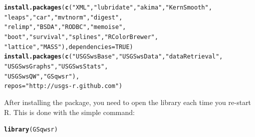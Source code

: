 \documentclass[a4paper,11pt]{article}\usepackage[]{graphicx}\usepackage[]{color}
\makeatletter
\newcommand{\hlnum}[1]{\textcolor[rgb]{0.686,0.059,0.569}{#1}}%
\newcommand{\hlstr}[1]{\textcolor[rgb]{0.192,0.494,0.8}{#1}}%
\newcommand{\hlstd}[1]{\textcolor[rgb]{0.345,0.345,0.345}{#1}}%
\newcommand{\hlkwc}[1]{\textcolor[rgb]{0.333,0.667,0.333}{#1}}%
\newcommand{\hlkwd}[1]{\textcolor[rgb]{0.737,0.353,0.396}{\textbf{#1}}}%
\newenvironment{kframe}{%
 \def\at@end@of@kframe{}%
 \ifinner\ifhmode%
  \def\at@end@of@kframe{\end{minipage}}%
  \begin{minipage}{\columnwidth}%
 \fi\fi%
 \def\FrameCommand##1{\hskip\@totalleftmargin \hskip-\fboxsep
 \colorbox{shadecolor}{##1}\hskip-\fboxsep
     \hskip-\linewidth \hskip-\@totalleftmargin \hskip\columnwidth}%
 \MakeFramed {\advance\hsize-\width
   \@totalleftmargin\z@ \linewidth\hsize
   \@setminipage}}%
 {\par\unskip\endMakeFramed%
 \at@end@of@kframe}
\newenvironment{knitrout}{}{} %
\makeatother
\begin{document}
\begin{knitrout}
\color{fgcolor}\begin{kframe}
\begin{alltt}
\hlkwd{install.packages}\hlstd{(}\hlkwd{c}\hlstd{(}\hlstr{"XML"}\hlstd{,} \hlstr{"lubridate"}\hlstd{,} \hlstr{"akima"}\hlstd{,} \hlstr{"KernSmooth"}\hlstd{,}
                   \hlstr{"leaps"}\hlstd{,} \hlstr{"car"}\hlstd{,} \hlstr{"mvtnorm"}\hlstd{,} \hlstr{"digest"}\hlstd{,}
                   \hlstr{"relimp"}\hlstd{,} \hlstr{"BSDA"}\hlstd{,} \hlstr{"RODBC"}\hlstd{,}\hlstr{"memoise"}\hlstd{,}
                   \hlstr{"boot"}\hlstd{,}\hlstr{"survival"}\hlstd{,}\hlstr{"splines"}\hlstd{,}\hlstr{"RColorBrewer"}\hlstd{,}
                   \hlstr{"lattice"}\hlstd{,}\hlstr{"MASS"}\hlstd{),} \hlkwc{dependencies}\hlstd{=}\hlnum{TRUE}\hlstd{)}
\hlkwd{install.packages}\hlstd{(}\hlkwd{c}\hlstd{(}\hlstr{"USGSwsBase"}\hlstd{,}\hlstr{"USGSwsData"}\hlstd{,}\hlstr{"dataRetrieval"}\hlstd{,}
                   \hlstr{"USGSwsGraphs"}\hlstd{,}\hlstr{"USGSwsStats"}\hlstd{,}
                   \hlstr{"USGSwsQW"}\hlstd{,}\hlstr{"GSqwsr"}\hlstd{),}
                 \hlkwc{repos}\hlstd{=}\hlstr{"http://usgs-r.github.com"}\hlstd{)}
\end{alltt}
\end{kframe}
\end{knitrout}



After installing the package, you need to open the library each time you re-start R.  This is done with the simple command:
\begin{knitrout}
\color{fgcolor}\begin{kframe}
\begin{alltt}
\hlkwd{library}\hlstd{(GSqwsr)}
\end{alltt}
\end{kframe}
\end{knitrout}
\end{document}

